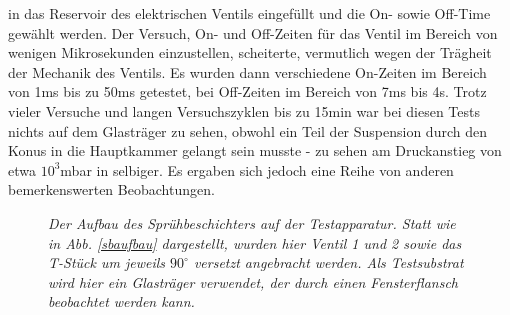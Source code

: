  in das Reservoir des elektrischen Ventils
 eingefüllt und die On- sowie Off-Time gewählt
 werden. Der Versuch, On- und Off-Zeiten für das Ventil im
Bereich von wenigen Mikrosekunden einzustellen,
scheiterte, vermutlich wegen der Trägheit der Mechanik des
Ventils. Es wurden dann verschiedene On-Zeiten im Bereich von 1ms bis zu 50ms getestet, bei
Off-Zeiten im Bereich von 7ms bis 4s. Trotz vieler Versuche und langen Versuchszyklen bis zu 15min
war bei diesen Tests nichts auf dem Glasträger zu sehen, obwohl ein Teil der Suspension durch den
Konus in die Hauptkammer gelangt sein musste - zu sehen am Druckanstieg von etwa $10^{3}$mbar in
selbiger. Es ergaben sich jedoch eine Reihe von anderen bemerkenswerten Beobachtungen.\\

 
\begin{figure}[H]
	\centering
	\sffamily
	
	\caption{\textit{Der Aufbau des Sprühbeschichters auf der Testapparatur. Statt wie in Abb.
	\ref{sbaufbau} dargestellt, wurden hier Ventil 1 und 2 sowie das T-Stück um jeweils $90^{\circ}$
	versetzt angebracht werden. Als Testsubstrat wird hier ein Glasträger verwendet, der durch einen
	Fensterflansch beobachtet werden kann. }}
\label{aufbau}
\end{figure}
 
 


 

